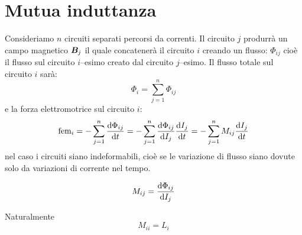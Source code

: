 \section{Mutua induttanza}
Consideriamo $n$ circuiti separati percorsi da correnti. Il circuito $j$ produrrà un campo magnetico $\boldsymbol{B}_j$ il quale concatenerà il circuito $i$ creando un flusso: $\Phi_{ij}$ cioè il flusso sul circuito $i$--esimo creato dal circuito $j$--esimo. Il flusso totale sul circuito $i$ sarà:
\begin{equation}
  \Phi_i=\sum_{j=1}^n\Phi_{ij}
\end{equation}
e la forza elettromotrice sul circuito $i$:
\begin{equation}
  \text{fem}_i=-\sum_{j=1}^n\frac{\mathrm{d}\Phi_{ij}}{\mathrm{d} t}=-\sum_{j=1}^n\frac{\mathrm{d}\Phi_{ij}}{\mathrm{d} I_j}\frac{\mathrm{d} I_j}{\mathrm{d} t}=-\sum_{j=1}^n M_{ij}\frac{\mathrm{d} I_j}{\mathrm{d} t}
\end{equation}
nel caso i circuiti siano indeformabili, cioè se le variazione di flusso siano dovute solo da variazioni di corrente nel tempo.
\begin{Def}
  \begin{equation}
    M_{ij}=\frac{\mathrm{d}\Phi_{ij}}{\mathrm{d} I_j}
  \end{equation}
\end{Def}
Naturalmente
\begin{equation}
  M_{ii}=L_i
\end{equation}
